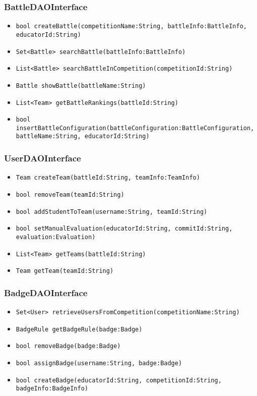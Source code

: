 \subsubsection{BattleDAOInterface}
\begin{itemize}
    \item \texttt{bool createBattle(competitionName:String, battleInfo:BattleInfo,\\educatorId:String)}%
    \item \texttt{Set<Battle> searchBattle(battleInfo:BattleInfo)}
    \item \texttt{List<Battle> searchBattleInCompetition(competitionId:String)}%
    \item \texttt{Battle showBattle(battleName:String)}
    \item \texttt{List<Team> getBattleRankings(battleId:String)}
    \item \texttt{bool insertBattleConfiguration(battleConfiguration:BattleConfiguration,\\battleName:String, educatorId:String)}%
\end{itemize}

\subsubsection{UserDAOInterface}
\begin{itemize}
    \item \texttt{Team createTeam(battleId:String, teamInfo:TeamInfo)}%
    \item \texttt{bool removeTeam(teamId:String)}
    \item \texttt{bool addStudentToTeam(username:String, teamId:String)}%
    \item \texttt{bool setManualEvaluation(educatorId:String, commitId:String,\\evaluation:Evaluation)}%
    \item \texttt{List<Team> getTeams(battleId:String)}%
    \item \texttt{Team getTeam(teamId:String)}%
\end{itemize}

\subsubsection{BadgeDAOInterface}
\begin{itemize}
    \item \texttt{Set<User> retrieveUsersFromCompetition(competitionName:String)}
    \item \texttt{BadgeRule getBadgeRule(badge:Badge)}
    \item \texttt{bool removeBadge(badge:Badge)}
    \item \texttt{bool assignBadge(username:String, badge:Badge)}
    \item \texttt{bool createBadge(educatorId:String, competitionId:String, badgeInfo:BadgeInfo)}%
\end{itemize}

